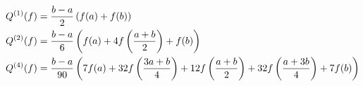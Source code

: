 \begin{align*}
    Q^{(1)}(f) \label{trapezium}
    & = \frac{b-a}{2}
        \left ( 
            f(a) +
            f(b)
         \right ) \\
    Q^{(2)}(f) \label{simpson}
    & = \frac{b-a}{6}
        \left ( 
            f(a) +
            4 f \left ( \frac{a+b}{2} \right ) +
            f(b)
         \right ) \\
    Q^{(4)}(f) \label{mile}
    & = \frac{b-a}{90}
        \left ( 
            7  f(a) + 
            32 f \left ( \frac{3a+b}{4} \right ) +
            12 f \left ( \frac{a+b}{2} \right ) +
            32 f \left ( \frac{a+3b}{4} \right ) +
            7  f(b)
         \right )
\end{align*}